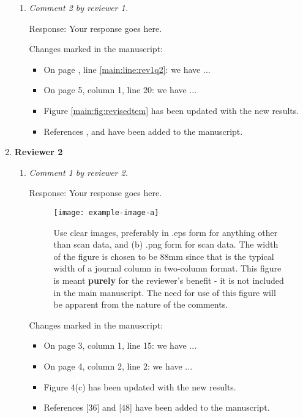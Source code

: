 \documentclass[12pt]{article}
\begin{document}
\begin{enumerate}
\begin{enumerate}
  \item \textit{Comment 2 by reviewer 1.}
    
    Response: Your response goes here.
    
    Changes marked in the manuscript:
    
    \begin{itemize}
    \item On page \pageref{main:page:rev1q2}, line \ref{main:line:rev1q2}: we have ...
    \item On page 5, column 1, line 20: we have ...
    \item Figure \ref{main:fig:revisedtem} has been updated with the new results.
    \item References \cite{main:virtanen:2020}, \cite{main:perez:2011} and \cite{main:stancin:2019} have been added to the manuscript.
    \end{itemize}
  \end{enumerate}
  
\item \textbf{Reviewer 2} %
  \begin{enumerate}
  \item \textit{Comment 1 by reviewer 2.}
    
    Response: Your response goes here.

    \begin{figure}
      \centering
      \texttt{[image: example-image-a]}
      \caption{Use clear images, preferably in .eps form for anything other than scan data, and (b) .png form for scan data. The width of the figure is chosen to be 88mm since that is the typical width of a journal column in two-column format. This figure is meant \textbf{purely} for the reviewer's benefit - it is not included in the main manuscript. The need for use of this figure will be apparent from the nature of the comments.}
      \label{fig:cv}
    \end{figure}
    
    Changes marked in the manuscript:
    
    \begin{itemize}
    \item On page 3, column 1, line 15: we have ...
    \item On page 4, column 2, line 2: we have ...
    \item Figure 4(c) has been updated with the new results.
    \item References [36] and [48] have been added to the manuscript.
    \end{itemize}
    

\end{enumerate}
\end{enumerate}
\end{document}
